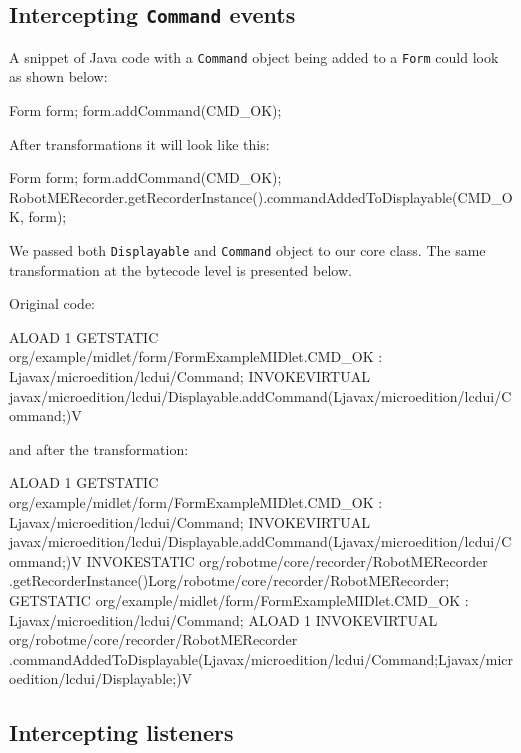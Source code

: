 \subsection{Intercepting \texttt{Command} events}

A snippet of Java code with a \texttt{Command} object being added to a \texttt{Form} could
look as shown below:

\begin{javablock}
Form form;
form.addCommand(CMD_OK);
\end{javablock}

\noindent%
After transformations it will look like this:

\begin{javablock}
Form form;
form.addCommand(CMD_OK);
RobotMERecorder.getRecorderInstance().commandAddedToDisplayable(CMD_OK, form);
\end{javablock}

We passed both \texttt{Displayable} and \texttt{Command} object to our core class. The same transformation
at the bytecode level is presented below.

\noindent%
Original code:

\begin{javablock}
ALOAD 1
GETSTATIC org/example/midlet/form/FormExampleMIDlet.CMD_OK : Ljavax/microedition/lcdui/Command;
INVOKEVIRTUAL javax/microedition/lcdui/Displayable.addCommand(Ljavax/microedition/lcdui/Command;)V
\end{javablock}

\noindent%
and after the transformation:

\begin{javablock}
ALOAD 1
GETSTATIC org/example/midlet/form/FormExampleMIDlet.CMD_OK : Ljavax/microedition/lcdui/Command;
INVOKEVIRTUAL javax/microedition/lcdui/Displayable.addCommand(Ljavax/microedition/lcdui/Command;)V
INVOKESTATIC org/robotme/core/recorder/RobotMERecorder
    .getRecorderInstance()Lorg/robotme/core/recorder/RobotMERecorder;
GETSTATIC org/example/midlet/form/FormExampleMIDlet.CMD_OK : Ljavax/microedition/lcdui/Command;
ALOAD 1
INVOKEVIRTUAL org/robotme/core/recorder/RobotMERecorder
    .commandAddedToDisplayable(Ljavax/microedition/lcdui/Command;Ljavax/microedition/lcdui/Displayable;)V
\end{javablock}


\subsection{Intercepting listeners}

